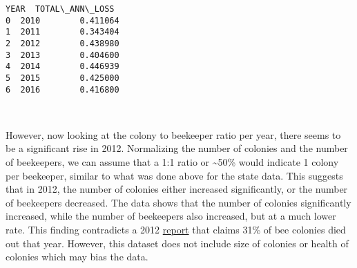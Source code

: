 \documentclass[11pt]{article}
\begin{document}
    \begin{Verbatim}[commandchars=\\\{\}]
   YEAR  TOTAL\_ANN\_LOSS
0  2010        0.411064
1  2011        0.343404
2  2012        0.438980
3  2013        0.404600
4  2014        0.446939
5  2015        0.425000
6  2016        0.416800

    \end{Verbatim}

    \begin{center}
    \end{center}
    { \hspace*{\fill} \\}
    
    However, now looking at the colony to beekeeper ratio per year, there
seems to be a significant rise in 2012. Normalizing the number of
colonies and the number of beekeepers, we can assume that a 1:1 ratio or
\textasciitilde{}50\% would indicate 1 colony per beekeeper, similar to
what was done above for the state data. This suggests that in 2012, the
number of colonies either increased significantly, or the number of
beekeepers decreased. The data shows that the number of colonies
significantly increased, while the number of beekeepers also increased,
but at a much lower rate. This finding contradicts a 2012
\href{https://beeinformed.org/results/winter-loss-survey-2012-2013-2/}{report}
that claims 31\% of bee colonies died out that year. However, this
dataset does not include size of colonies or health of colonies which
may bias the data.
\end{document}
